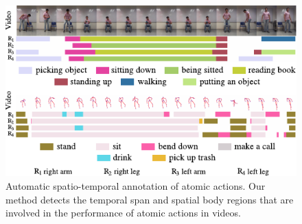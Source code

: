  

\begin{figure}[th]
\begin{center}
\scriptsize
\includegraphics[]{Fig/labels_acciones}
\end{center}
\vspace{-4mm}
\caption{
\footnotesize
Automatic spatio-temporal annotation of atomic actions. Our method
detects the temporal span and spatial body regions that are involved in
the performance of atomic actions in videos.}
\label{fig:actionlabels}
\end{figure}


